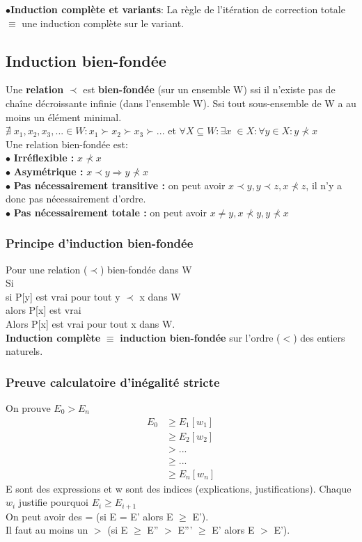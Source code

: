 $\bullet$\textbf{Induction complète et variants}:
La règle de l'itération de correction totale $\equiv$ une induction complète sur le variant.
\subsection{Induction bien-fondée}
Une \textbf{relation} $\prec$ est \textbf{bien-fondée} (sur un ensemble W) ssi il n'existe pas de chaîne décroissante infinie (dans l'ensemble W). Ssi tout sous-ensemble de W a au moins un élément minimal.\\
$ \nexists \; x_1,x_2,x_3,... \in W : x_1 \succ x_2 \succ x_3 \succ ... $ et
$\forall X \subseteq W : \exists x \; \in X : \forall y \in X : y \nprec x $\\

Une relation bien-fondée est:\\
$\bullet$ \textbf{Irréflexible :} $x \nprec x$\\
$\bullet$ \textbf{Asymétrique :} $x \prec y \Rightarrow y \nprec x$\\
$\bullet$ \textbf{Pas nécessairement transitive :} on peut avoir $x \prec y, y \prec z, x \nprec z$, il n'y a donc pas nécessairement d'ordre.\\
$\bullet$ \textbf{Pas nécessairement totale :} on peut avoir $x \neq y, x \nprec y, y \nprec x$\\

\subsubsection{Principe d'induction bien-fondée}
Pour une relation ($\prec$) bien-fondée dans W\\
Si\\
si P[y] est vrai pour tout y $\prec$ x dans W \\ alors P[x] est vrai\\
Alors P[x] est vrai pour tout x dans W.\\

\textbf{Induction complète} $\equiv$ \textbf{induction bien-fondée} sur l'ordre ($<$) des entiers naturels.

\subsubsection{Preuve calculatoire d'inégalité stricte}
On prouve $E_0 > E_n$
\begin{align*}
E_0 &\geq E_1 [w_1]\\
&\geq E_2 [w_2]\\
&> ...\\
&\geq ...\\
&\geq E_n [w_n]
\end{align*}
E sont des expressions et w sont des indices (explications, justifications). Chaque $w_i$ justifie pourquoi $E_i \geq E_{i+1}$\\
On peut avoir des = (si E = E' alors E $\geq$ E').\\
Il faut au moins un $>$ (si E $\geq$ E'' $>$ E''' $\geq$ E' alors E $>$ E').

